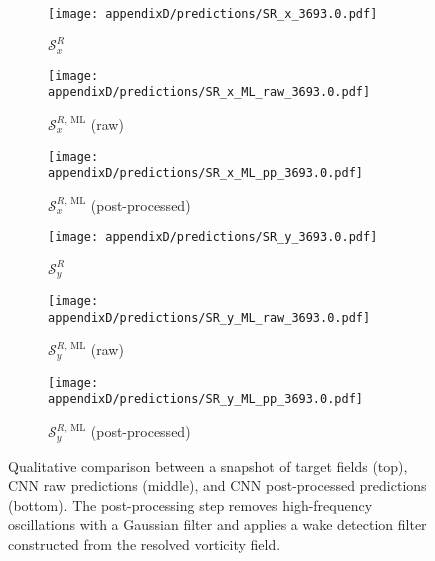 \documentclass[../main.tex]{subfiles}
\begin{document}
\begin{figure*}[!ht]
\begin{multicols}{2}
\begin{subfigure}[t]{\linewidth}
    \texttt{[image: appendixD/predictions/SR\_x\_3693.0.pdf]}\caption{$\mathcal{S}^R_x$} 
\end{subfigure}\vspace{0.5cm}
\begin{subfigure}[t]{\linewidth}
    \texttt{[image: appendixD/predictions/SR\_x\_ML\_raw\_3693.0.pdf]} \caption{$\mathcal{S}^{R,\,\mathrm{ML}}_x$ (raw)}
\end{subfigure}\vspace{0.5cm}
\begin{subfigure}[t]{\linewidth}
    \texttt{[image: appendixD/predictions/SR\_x\_ML\_pp\_3693.0.pdf]} \caption{$\mathcal{S}^{R,\,\mathrm{ML}}_x$ (post-processed)}
\end{subfigure}
\begin{subfigure}[t]{\linewidth}
    \texttt{[image: appendixD/predictions/SR\_y\_3693.0.pdf]}\caption{$\mathcal{S}^R_y$}
\end{subfigure}\vspace{0.5cm}
\begin{subfigure}[t]{\linewidth}
    \texttt{[image: appendixD/predictions/SR\_y\_ML\_raw\_3693.0.pdf]}\caption{$\mathcal{S}^{R,\,\mathrm{ML}}_y$ (raw)}
\end{subfigure}\vspace{0.5cm}
\begin{subfigure}[t]{\linewidth}
    \texttt{[image: appendixD/predictions/SR\_y\_ML\_pp\_3693.0.pdf]}\caption{$\mathcal{S}^{R,\,\mathrm{ML}}_y$ (post-processed)}
\end{subfigure}
\end{multicols}
\caption{Qualitative comparison between a snapshot of target fields (top), CNN raw predictions (middle), and CNN post-processed predictions (bottom).
The post-processing step removes high-frequency oscillations with a Gaussian filter and applies a wake detection filter constructed from the resolved vorticity field.}
\label{fig:predictions}
\end{figure*}
\end{document}
